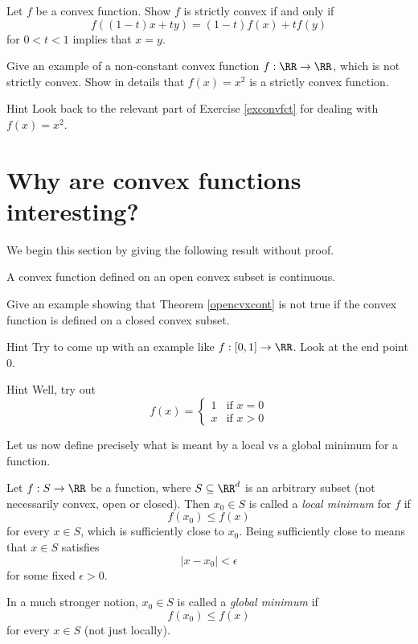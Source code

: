 \documentclass{article}
\begin{document}
  \beginshex
  Let $f$ be a convex function. Show $f$ is strictly convex if and only if
  $$
  f((1-t) x + t y) = (1-t) f(x) + t f(y)
  $$
  for $0 < t < 1$ implies that $x=y$.
  \endshex

  \beginshex
  Give an example of a non-constant convex function $f:\RR\rightarrow \RR$, which is not strictly convex. Show in
  details that $f(x) = x^2$ is a strictly convex function.

  \begin{hideinbutton}{Hint}
    Look back to the relevant part of Exercise \ref{exconvfct} for
    dealing with $f(x) = x^2$.
    \end{hideinbutton}
  \endshex



  

\section{Why are convex functions interesting?}

  We begin this section by giving the following result without proof.

  \begin{theorem}[emph]\label{opencvxcont}
    A convex function defined on an open convex subset is continuous.
  \end{theorem}

  \beginshex
  Give an example showing that Theorem \ref{opencvxcont} is not true if the convex function
  is defined on a closed convex subset.

  \begin{hideinbutton}{Hint}
    Try to come up with an example like $f: [0, 1] \rightarrow \RR$. Look at
    the end point $0$.
    
    \begin{hideinbutton}{Hint}
      Well, try out
      $$
      f(x) =
      \begin{cases}
        1&\text{if } x = 0\\
        x&\text{if } x > 0
      \end{cases}
      $$
    \end{hideinbutton}
    \end{hideinbutton}
  \endshex

  

Let us now define precisely what is meant by a local vs a global minimum
for a function.


\begin{definition}[emph]\label{Def:localglobalmin}
Let $f: S\rightarrow \RR$ be a function, where $S\subseteq\RR^d$ is an
arbitrary subset (not necessarily convex, open or closed). Then
$x_0\in S$ is called a \emph{local minimum} for $f$ if
$$
f(x_0)\leq f(x)
$$
for every $x\in S$, which is sufficiently close to $x_0$. Being
sufficiently close to means that $x\in S$ satisfies
$$
| x - x_0 | < \epsilon
$$
for some fixed $\epsilon > 0$.

In a much stronger notion, $x_0\in S$ is called a \emph{global minimum} if
$$
f(x_0) \leq f(x)
$$
for every $x\in S$ (not just locally).
\end{definition}
\end{document}
